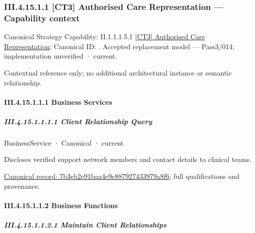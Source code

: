 \subsubsection*{III.4.15.1.1 [CT3] Authorised Care Representation — Capability context}
\label{navigation:III.4.15.1.1}

{\small Canonical Strategy Capability: II.1.1.1.5.1 \hyperref[element:a7092757af934517850ff63707397050]{[CT3] Authorised Care Representation}; Canonical ID: \texttt{}. Accepted replacement model — Pass3/014; implementation unverified · current.}\par
Contextual reference only; no additional architectural instance or semantic relationship.\par
\paragraph*{III.4.15.1.1.1 Business Services}
\label{navigation:III.4.15.1.1.1}

\subparagraph*{III.4.15.1.1.1.1 Client Relationship Query}
\label{navigation:III.4.15.1.1.1.1}

\label{element:7b3eb2e91baa4e9c887927433979a8f6}
{\small BusinessService · Canonical · current}\par

Discloses verified support network members and contact details to clinical teams.


{\footnotesize \href{../../../../../../../continuum/business/business-service/7b3eb2e91baa4e9c887927433979a8f6.md}{Canonical record: 7b3eb2e91baa4e9c887927433979a8f6}; full qualifications and provenance.}\par
\paragraph*{III.4.15.1.1.2 Business Functions}
\label{navigation:III.4.15.1.1.2}

\subparagraph*{III.4.15.1.1.2.1 Maintain Client Relationships}
\label{navigation:III.4.15.1.1.2.1}

